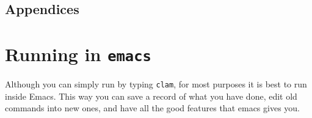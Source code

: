 \documentclass{article}
\begin{document}
%
%
%


\appendix

\begin{center}
\section*{Appendices}
\end{center}


\section{Running \clam in {\tt emacs}\label{emacs}}

Although you can simply run \clam by typing {\tt clam}, for most
purposes it is best to run \clam inside Emacs. This way you can save a
record of what you have done, edit old commands into new ones, and
have all the good features that emacs gives you.
\end{document}
